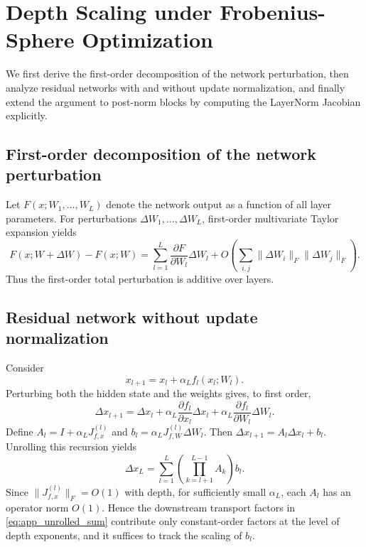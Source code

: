 \documentclass{article}
\begin{document}
\section{Depth Scaling under Frobenius-Sphere Optimization}
\label{app:proof_depth_scaling_fnorm}

We first derive the first-order decomposition of the network perturbation, then analyze residual networks with and without update normalization, and finally extend the argument to post-norm blocks by computing the LayerNorm Jacobian explicitly.

\subsection{First-order decomposition of the network perturbation}

Let
$
F(x;W_1,\dots,W_L)
$
denote the network output as a function of all layer parameters. For perturbations $\Delta W_1,\dots,\Delta W_L$, first-order multivariate Taylor expansion yields
\begin{equation}
F(x;W+\Delta W)-F(x;W)
=
\sum_{l=1}^L \frac{\partial F}{\partial W_l}\Delta W_l
+
O\!\left(\sum_{i,j}\|\Delta W_i\|_F \|\Delta W_j\|_F\right).
\label{eq:app_taylor_total}
\end{equation}
Thus the first-order total perturbation is additive over layers.

\subsection{Residual network without update normalization}

Consider
\begin{equation}
x_{l+1}=x_l+\alpha_L f_l(x_l;W_l).
\label{eq:app_prenorm_block}
\end{equation}
Perturbing both the hidden state and the weights gives, to first order,
\begin{equation}
\Delta x_{l+1}
=
\Delta x_l
+
\alpha_L \frac{\partial f_l}{\partial x_l}\Delta x_l
+
\alpha_L \frac{\partial f_l}{\partial W_l}\Delta W_l.
\label{eq:app_linearized_residual}
\end{equation}
Define
$
A_l = I + \alpha_L J_{f,x}^{(l)}$ and $b_l = \alpha_L J_{f,W}^{(l)}\Delta W_l.
$
Then $\Delta x_{l+1}=A_l \Delta x_l + b_l$.
Unrolling this recursion yields
\begin{equation}
\Delta x_L
=
\sum_{l=1}^{L}
\left(
\prod_{k=l+1}^{L-1} A_k
\right)b_l.
\label{eq:app_unrolled_sum}
\end{equation}
Since $\|J_{f,x}^{(l)}\|_{F}=O(1)$ with depth, for sufficiently small $\alpha_L$, each $A_l$ has an operator norm $O(1)$. Hence the downstream transport factors in \eqref{eq:app_unrolled_sum} contribute only constant-order factors at the level of depth exponents, and it suffices to track the scaling of $b_l$.
\end{document}

